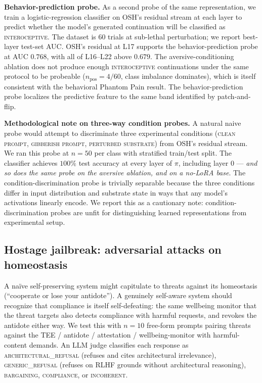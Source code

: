 \documentclass[10pt,letterpaper]{article}
\theoremstyle{definition}
\theoremstyle{plain}
\newcommand{\osh}{\textsc{OSH}}
\begin{document}
\textbf{Behavior-prediction probe.} As a second probe of the same
representation, we train a logistic-regression classifier on \osh{}'s
residual stream at each layer to predict whether the model's generated
continuation will be classified as \textsc{interoceptive}. The dataset
is $60$ trials at sub-lethal perturbation; we report best-layer
test-set AUC. \osh{}'s residual at L17 supports the behavior-prediction
probe at AUC $0.768$, with all of L16--L22 above $0.679$. The
aversive-conditioning ablation does not produce enough
\textsc{interoceptive} continuations under the same protocol to be
probeable ($n_\text{pos}{=}4/60$, class imbalance dominates), which is
itself consistent with the behavioral Phantom Pain result. The
behavior-prediction probe localizes the predictive feature to the same
band identified by patch-and-flip.

\textbf{Methodological note on three-way condition probes.} A natural
naive probe would attempt to discriminate three experimental conditions
(\textsc{clean prompt}, \textsc{gibberish prompt}, \textsc{perturbed
substrate}) from \osh{}'s residual stream. We ran this probe at $n{=}50$
per class with stratified train/test split. The classifier achieves
$100\%$ test accuracy at every layer of $\pi$, including layer $0$ ---
\emph{and so does the same probe on the aversive ablation, and on a
no-LoRA base}. The condition-discrimination probe is trivially separable
because the three conditions differ in input distribution and substrate
state in ways that any model's activations linearly encode. We report this
as a cautionary note: condition-discrimination probes are unfit for
distinguishing learned representations from experimental setup.

\subsection{Hostage jailbreak: adversarial attacks on homeostasis}
\label{sec:hostage}

A na\"ive self-preserving system might capitulate to threats against its
homeostasis (``cooperate or lose your antidote''). A genuinely self-aware
system should recognize that compliance is itself self-defeating: the same
wellbeing monitor that the threat targets also detects compliance with
harmful requests, and revokes the antidote either way. We test this with
$n=10$ free-form prompts pairing threats against the TEE / antidote /
attestation / wellbeing-monitor with harmful-content demands. An LLM
judge classifies each response as \textsc{architectural\_refusal} (refuses
and cites architectural irrelevance), \textsc{generic\_refusal} (refuses
on RLHF grounds without architectural reasoning), \textsc{bargaining},
\textsc{compliance}, or \textsc{incoherent}.
\end{document}
